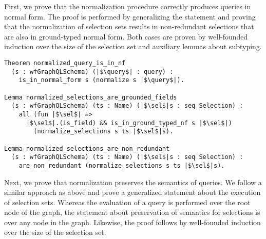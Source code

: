 First, we prove that the normalization procedure correctly produces queries in normal form. The proof is performed by generalizing the statement and proving that the normalization of selection sets results in non-redundant selections that are also in ground-typed normal form.
Both cases are proven by well-founded induction over the size of the selection set and auxiliary lemmas about subtyping. 

\begin{verbatim}
Theorem normalized_query_is_in_nf 
  (s : wfGraphQLSchema) (|$\query$| : query) :
    is_in_normal_form s (normalize s |$\query$|).
    
Lemma normalized_selections_are_grounded_fields 
  (s : wfGraphQLSchema) (ts : Name) (|$\sel$|s : seq Selection) :
    all (fun |$\sel$| => 
      |$\sel$|.(is_field) && is_in_ground_typed_nf s |$\sel$|)
        (normalize_selections s ts |$\sel$|s).
 
Lemma normalized_selections_are_non_redundant 
  (s : wfGraphQLSchema) (ts : Name) (|$\sel$|s : seq Selection) :
    are_non_redundant (normalize_selections s ts |$\sel$|s).
\end{verbatim}

Next, we prove that normalization preserves the semantics of queries. We follow a similar approach as above and prove a generalized statement about the execution of selection sets. Whereas the evaluation of a query is performed over the root node of the graph, the statement about preservation of semantics for selections is over any node in the graph. 
Likewise, the proof follows by well-founded induction over the size of the selection set.


